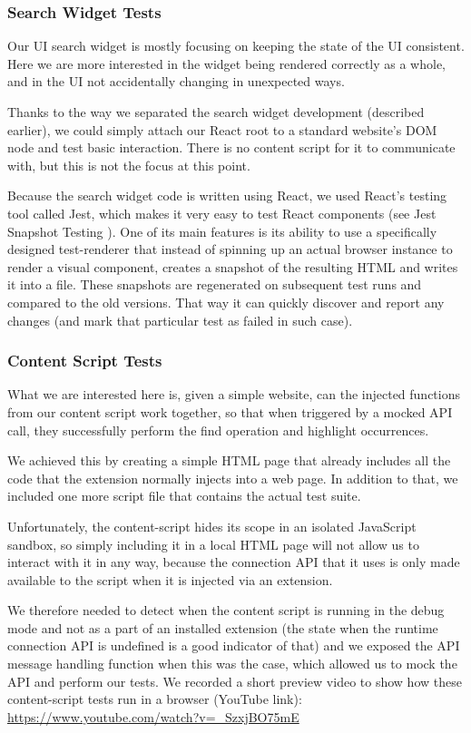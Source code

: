 \documentclass[bsc,frontabs,twoside,singlespacing,parskip,deptreport]{infthesis}
\begin{document}
\subsubsection{Search Widget Tests}
Our UI search widget is mostly focusing on keeping the state of the UI consistent. Here we are more interested in the widget being rendered correctly as a whole, and in the UI not accidentally changing in unexpected ways.

Thanks to the way we separated the search widget development (described earlier), we could simply attach our React root to a standard website's DOM node and test basic interaction. There is no content script for it to communicate with, but this is not the focus at this point.

Because the search widget code is written using React, we used React's testing tool called Jest, which makes it very easy to test React components (see Jest Snapshot Testing \cite{A13}). One of its main features is its ability to use a specifically designed test-renderer that instead of spinning up an actual browser instance to render a visual component, creates a snapshot of the resulting HTML and writes it into a file. These snapshots are regenerated on subsequent test runs and compared to the old versions. That way it can quickly discover and report any changes (and mark that particular test as failed in such case).

\subsubsection{Content Script Tests}
What we are interested here is, given a simple website, can the injected functions from our content script work together, so that when triggered by a mocked API call, they successfully perform the find operation and highlight occurrences.

We achieved this by creating a simple HTML page that already includes all the code that the extension normally injects into a web page. In addition to that, we included one more script file that contains the actual test suite.

Unfortunately, the content-script hides its scope in an isolated JavaScript sandbox, so simply including it in a local HTML page will not allow us to interact with it in any way, because the connection API that it uses is only made available to the script when it is injected via an extension.

We therefore needed to detect when the content script is running in the debug mode and not as a part of an installed extension (the state when the runtime connection API is undefined is a good indicator of that) and we exposed the API message handling function when this was the case, which allowed us to mock the API and perform our tests. We recorded a short preview video to show how these content-script tests run in a browser (YouTube link): \url{https://www.youtube.com/watch?v=_SzxjBO75mE}
\end{document}
